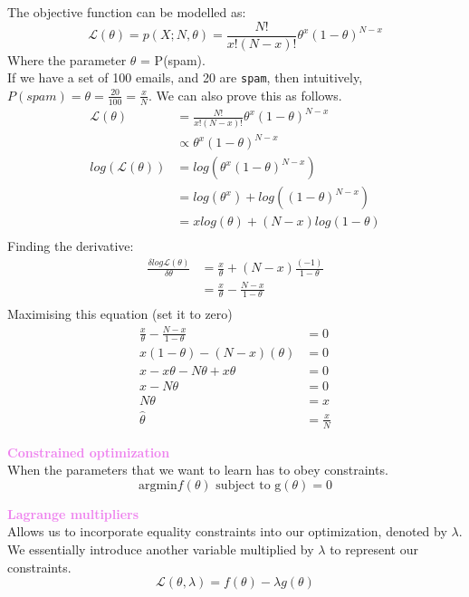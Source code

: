 \documentclass[a4paper,10pt]{article}
\begin{document}
The objective function can be modelled as:
\begin{equation*}
	\mathcal{L}(\theta) = p(X; N, \theta) = \frac{N!}{x!(N-x)!}\theta^{x}(1-\theta)^{N-x}
\end{equation*}
Where the parameter $\theta$ = P(spam). \\
If we have a set of 100 emails, and 20 are \texttt{spam}, then intuitively, 
$P(spam) = \theta = \frac{20}{100} = \frac{x}{N}$. We can also prove this as follows. 
\begin{align*}
	\mathcal{L}(\theta) &= \frac{N!}{x!(N-x)!}\theta^{x}(1-\theta)^{N-x} \\
	&\propto \theta^{x}(1-\theta)^{N-x} \\
	log(\mathcal{L}(\theta)) &= log(\theta^{x}(1-\theta)^{N-x}) \\
	&= log(\theta^x) + log((1 - \theta)^{N-x}) \\
	&= xlog(\theta) + (N-x)log(1 - \theta) \\
\end{align*}
Finding the derivative: 
\begin{align*}
	\frac{\delta log \mathcal{L}(\theta)}{\delta \theta} &= \frac{x}{\theta} + (N-x)\frac{(-1)}{1-\theta} \\
	&= \frac{x}{\theta} - \frac{N-x}{1 - \theta} \\
\end{align*}
Maximising this equation (set it to zero)
\begin{align*}
	\frac{x}{\theta} - \frac{N-x}{1 - \theta} &= 0 \\
	x(1 - \theta) - (N-x)(\theta) &= 0 \\
	x - x\theta - N\theta + x\theta &= 0 \\
	x - N\theta &= 0 \\
	N\theta &= x \\
	\hat{\theta} &= \frac{x}{N}
\end{align*}
\begin{shaded}
\noindent \textcolor{Violet}{\textbf{Constrained optimization}}\\
When the parameters that we want to learn has to obey constraints.
\begin{equation*}
	\text{argmin}f(\theta) \text{ subject to g}(\theta) = 0
\end{equation*}
\end{shaded} 
\begin{shaded}
	\noindent \textcolor{Violet}{\textbf{Lagrange multipliers}}\\
	Allows us to incorporate equality constraints into our optimization, denoted by $\lambda$. We essentially introduce another variable multiplied by $\lambda$ to represent our constraints. 
	\begin{equation*}
		\mathcal{L}(\theta, \lambda) = f(\theta) - \lambda g(\theta)
	\end{equation*}
\end{shaded} 
\end{document}
